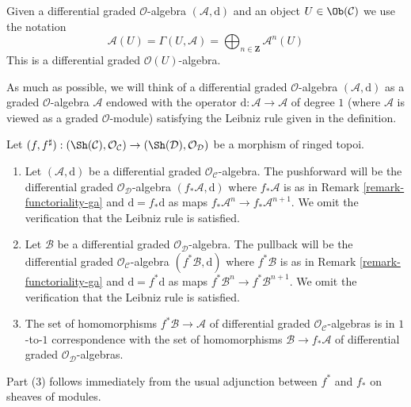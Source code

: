\noindent
Given a differential graded $\mathcal{O}$-algebra $(\mathcal{A}, \text{d})$
and an object $U \in \Ob(\mathcal{C})$ we use the notation
$$
\mathcal{A}(U) =
\Gamma(U, \mathcal{A}) =
\bigoplus\nolimits_{n \in \mathbf{Z}} \mathcal{A}^n(U)
$$
This is a differential graded $\mathcal{O}(U)$-algebra.

\medskip\noindent
As much as possible, we will think of a differential graded
$\mathcal{O}$-algebra $(\mathcal{A}, \text{d})$
as a graded $\mathcal{O}$-algebra $\mathcal{A}$ endowed with
the operator $\text{d} : \mathcal{A} \to \mathcal{A}$ of degree $1$
(where $\mathcal{A}$ is viewed as a graded $\mathcal{O}$-module)
satisfying the Leibniz rule given in the definition.

\begin{remark}
\label{remark-functoriality-dga}
Let $(f, f^\sharp) : (\Sh(\mathcal{C}), \mathcal{O}_\mathcal{C})
\to (\Sh(\mathcal{D}), \mathcal{O}_\mathcal{D})$
be a morphism of ringed topoi.
\begin{enumerate}
\item Let $(\mathcal{A}, \text{d})$ be a differential graded
$\mathcal{O}_\mathcal{C}$-algebra. The pushforward will be
the differential graded $\mathcal{O}_\mathcal{D}$-algebra
$(f_*\mathcal{A}, \text{d})$ where $f_*\mathcal{A}$ is as in
Remark \ref{remark-functoriality-ga} and
$\text{d} = f_*\text{d}$ as maps $f_*\mathcal{A}^n \to f_*\mathcal{A}^{n + 1}$.
We omit the verification that the Leibniz rule is satisfied.
\item Let $\mathcal{B}$ be a differential graded
$\mathcal{O}_\mathcal{D}$-algebra. The pullback will be the
differential graded $\mathcal{O}_\mathcal{C}$-algebra
$(f^*\mathcal{B}, \text{d})$ where $f^*\mathcal{B}$ is as in
Remark \ref{remark-functoriality-ga} and
$\text{d} = f^*\text{d}$ as maps $f^*\mathcal{B}^n \to f^*\mathcal{B}^{n + 1}$.
We omit the verification that the Leibniz rule is satisfied.
\item The set of homomorphisms $f^*\mathcal{B} \to \mathcal{A}$
of differential graded $\mathcal{O}_\mathcal{C}$-algebras is in
$1$-to-$1$ correspondence with the set of homomorphisms
$\mathcal{B} \to f_*\mathcal{A}$ of differential graded
$\mathcal{O}_\mathcal{D}$-algebras.
\end{enumerate}
Part (3) follows immediately from the usual adjunction between $f^*$ and $f_*$
on sheaves of modules.
\end{remark}

















